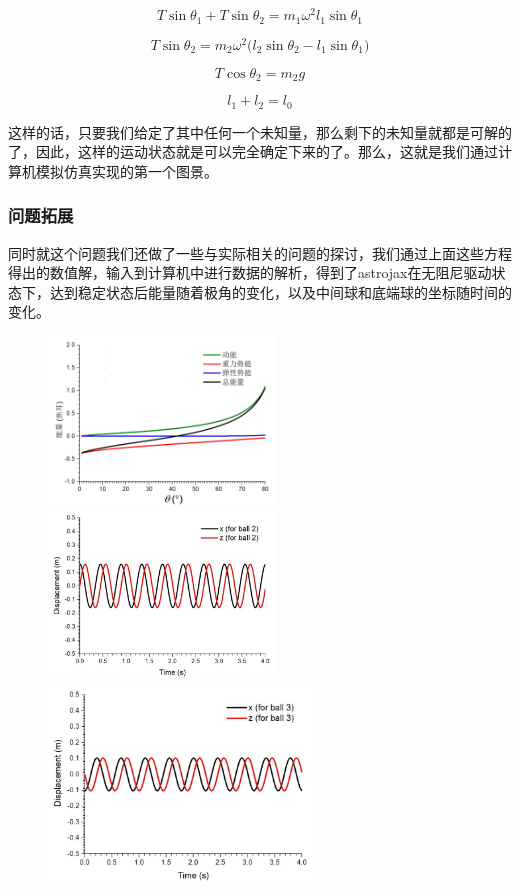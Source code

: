 \documentclass[12pt,a4paper]{ctexart}
\begin{document}
	$$T\sin{\theta_1}+T\sin{\theta_2}=m_1\omega^2l_1\sin{\theta_1}$$
	
	$$T\sin{\theta_2}=m_2\omega^2(l_2\sin{\theta_2-l_1\sin{\theta_1)}}$$
	
	$$T\cos{\theta_2}=m_2g$$
	
	$$l_1+l_2=l_0$$
	
	这样的话，只要我们给定了其中任何一个未知量，那么剩下的未知量就都是可解的了，因此，这样的运动状态就是可以完全确定下来的了。那么，这就是我们通过计算机模拟仿真实现的第一个图景。
	\clearpage
	\thispagestyle{empty}
	\subsubsection{问题拓展}
	同时就这个问题我们还做了一些与实际相关的问题的探讨，我们通过上面这些方程得出的数值解，输入到计算机中进行数据的解析，得到了astrojax在无阻尼驱动状态下，达到稳定状态后能量随着极角的变化，以及中间球和底端球的坐标随时间的变化。
		\begin{figure}[htb]
		\centering
		{
			\includegraphics[width=6cm]{T04.png}}
		\hspace{0in}   
		{
			\includegraphics[width=6cm]{T05.jpg}}
		\hspace{0in}
		{
			\includegraphics[width=7cm]{T06.jpg}}
		\hspace{0in}
		
	\end{figure}
	
\end{document}
